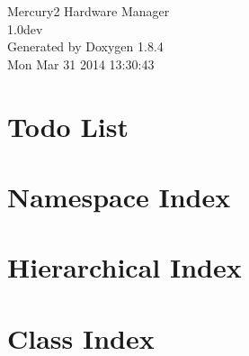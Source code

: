 \documentclass[twoside]{book}
\newcommand{\clearemptydoublepage}{%
  \newpage{\pagestyle{empty}\cleardoublepage}%
}
\begin{document}
\hypersetup{pageanchor=false}
\begin{titlepage}
\vspace*{7cm}
\begin{center}%
{\Large Mercury2 Hardware Manager \\[1ex]\large 1.\-0dev }\\
\vspace*{1cm}
{\large Generated by Doxygen 1.8.4}\\
\vspace*{0.5cm}
{\small Mon Mar 31 2014 13:30:43}\\
\end{center}
\end{titlepage}
\clearemptydoublepage
\tableofcontents
\clearemptydoublepage
{}
\hypersetup{pageanchor=true}

\chapter{Todo List}
\label{todo}
\hypertarget{todo}{}

\chapter{Namespace Index}

\chapter{Hierarchical Index}

\chapter{Class Index}

\end{document}
